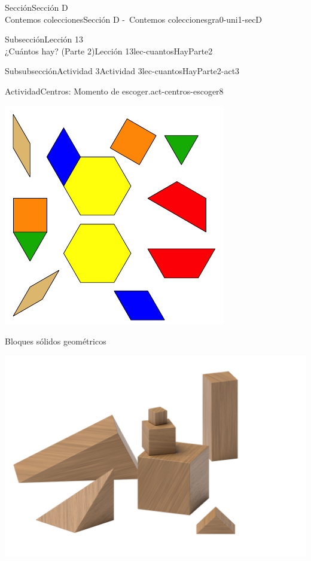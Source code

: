 \begin{sectionptx}{Sección}{{\Large Sección D\\}Contemos colecciones}{}{Sección D -~Contemos colecciones}{}{}{gra0-uni1-secD}
\begin{subsectionptx}{Subsección}{{\normalsize Lección 13\\[-0.05cm]}¿Cuántos hay? (Parte 2)}{}{Lección 13}{}{}{lec-cuantosHayParte2}
\begin{subsubsectionptx}{Subsubsección}{Actividad 3}{}{Actividad 3}{}{}{lec-cuantosHayParte2-act3}
\begin{activity}{Actividad}{Centros: Momento de escoger.}{act-centros-escoger8}
\begin{sidebyside}{2}{0.025}{0.025}{0.05}
\begin{sbspanel}{0.45}
\includegraphics[max width=\linewidth, center]{external/svg-source/tikz-file-147344.pdf}
\end{sbspanel}%
\end{sidebyside}%
\begin{sidebyside}{2}{0.025}{0.025}{0.05}%
\begin{sbspanel}{0.45}%
Bloques sólidos geométricos%
\par
\includegraphics[max width=\linewidth, center]{external/png-source/K.1.A Beta Student Workbook.Geoblocks.png}
\end{sbspanel}%

\end{sidebyside}
\end{activity}
\end{subsubsectionptx}
\end{subsectionptx}
\end{sectionptx}
